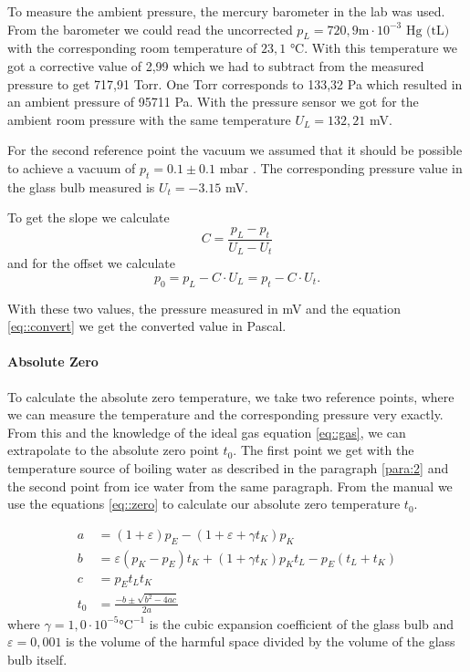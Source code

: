 To measure the ambient pressure, the mercury barometer in the lab was used.
From the barometer we could read the uncorrected $p_L = 720,9$$\si{\m} \cdot 10^{-3} \text{  Hg (tL)}$ with the corresponding room temperature of $23,1$ $\si{\degreeCelsius}$. 
With this temperature we got a corrective value of 2,99 which we had to subtract from the measured pressure to get 717,91 Torr.
One Torr corresponds to 133,32 Pa which resulted in an ambient pressure of 95711 Pa.
With the pressure sensor we got for the ambient room pressure with the same temperature $U_L = 132,21$ \si{\milli\volt}.


For the second reference point the vacuum we assumed that it should be possible to achieve a vacuum of $p_t = 0.1\pm 0.1$ mbar \cite{manual}. 
The corresponding pressure value in the glass bulb measured is $ U_t = -3.15$ \si{\milli\volt}.


To get the slope we calculate
\[
C= \frac{p_L -p_t}{U_L -U_t}
\]
and for the offset we calculate
\[
p_0= p_L-C\cdot U_L = p_t-C\cdot U_t.
\]

With these two values, the pressure measured in \si{\milli\volt} and the equation \ref{eq::convert} we get the converted value in Pascal.


\paragraph{Absolute Zero} To calculate the absolute zero temperature, we take two reference points, where we can measure the temperature and the corresponding pressure very exactly. 
From this and the knowledge of the ideal gas equation \ref{eq::gas}, we can extrapolate to the absolute zero point $t_0$.
The first point we get with the temperature source of boiling water as described in the paragraph \ref{para:2} and the second point from ice water from the same paragraph.
From the manual\cite{manual} we use the equations \ref{eq::zero} to calculate our absolute zero temperature $t_0$.

\begin{equation}
\begin{aligned}
a &=(1+\varepsilon) p_{E}-\left(1+\varepsilon+\gamma t_{K}\right) p_{K} \\
b &=\varepsilon\left(p_{K}-p_{E}\right) t_{K}+\left(1+\gamma t_{K}\right) p_{K} t_{L}-p_{E}\left(t_{L}+t_{K}\right) \\
c &=p_{E} t_{L} t_{K} \\
t_{0} &=\frac{-b \pm \sqrt{b^{2}-4 a c}}{2 a}
\end{aligned}
\label{eq::zero}
\end{equation}
where $\gamma = 1,0 \cdot 10^{-5} \si{\degreeCelsius}^{-1}$ is the cubic expansion coefficient of the glass bulb and $\varepsilon = 0,001$ is the volume of the harmful space divided by the volume of the glass bulb itself.


